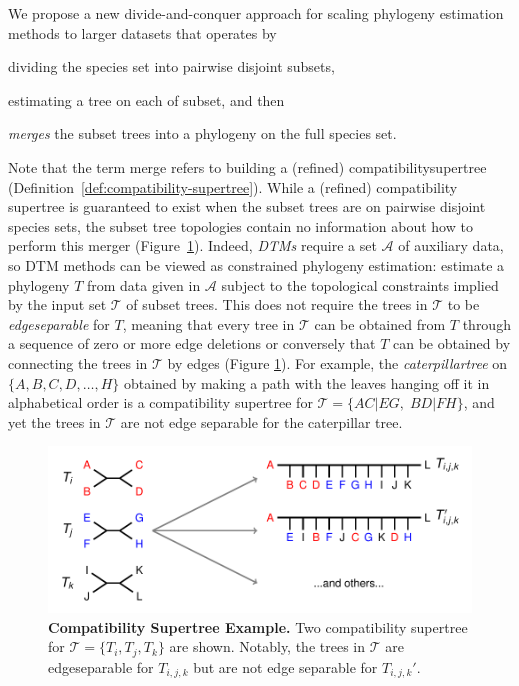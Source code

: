 We propose a new divide-and-conquer approach for scaling \gls{phylogeny} estimation methods to larger datasets that operates by 
\begin{enumerate*}[label=(\roman*)]
	\item 
	dividing the species set into pairwise disjoint subsets, 
	\item 
	estimating a tree on each of subset, and then 
	\item 
	\textit{\glspl{merge}} the subset trees into a phylogeny on the full species set. 
\end{enumerate*}
Note that the term merge refers to building a (refined) \gls{compatibilitysupertree} (Definition~\ref{def:compatibility-supertree}).
While a (refined) compatibility supertree is guaranteed to exist when the subset trees are on pairwise disjoint species sets, the subset tree topologies contain no information about how to perform this merger (Figure~\ref{fig:njmerge-compatibility-supertree}).
Indeed, \textit{\glspl{DTM}} require a set $\mathcal{A}$ of auxiliary data, so DTM methods can be viewed as constrained phylogeny estimation: estimate a phylogeny $T$ from data given in $\mathcal{A}$ subject to the topological constraints implied by the input set $\mathcal{T}$ of subset trees.
This does not require the trees in $\mathcal{T}$ to be \textit{\gls{edgeseparable}} for $T$, meaning that every tree in $\mathcal{T}$ can be obtained from $T$ through a sequence of zero or more edge deletions or conversely that $T$ can be obtained by connecting the trees in $\mathcal{T}$ by edges (Figure \ref{fig:njmerge-compatibility-supertree}).
For example, the \textit{\gls{caterpillartree}} on $\{A,B,C,D,\dots,H\}$ obtained by making a path with the leaves hanging off it in alphabetical order is a compatibility supertree for $\mathcal{T} = \{AC|EG, \; BD|FH\}$, and yet the trees in $\mathcal{T}$ are not edge separable for the caterpillar tree.

\begin{figure}[!h]
\centering
\includegraphics[width=1.0\textwidth]{figures/njmerge-fig1.pdf}
\caption{{\bf Compatibility Supertree Example.} 
Two compatibility supertree for $\mathcal{T} = \{T_i, T_j, T_k \}$ are shown. 
Notably, the trees in $\mathcal{T}$ are \gls{edgeseparable} for $T_{i,j,k}$ but are not edge separable for $T_{i,j,k}'$.
}
\label{fig:njmerge-compatibility-supertree}
\end{figure}

